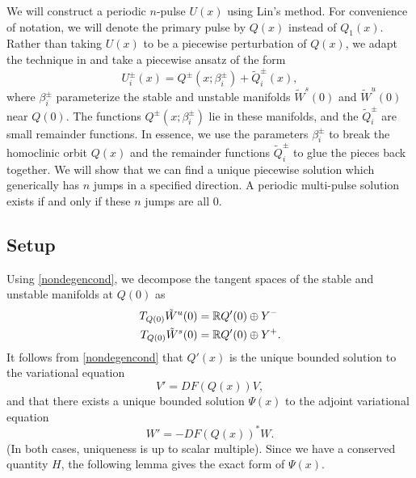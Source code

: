 \documentclass[12pt]{elsarticle}
\theoremstyle{plain}
\theoremstyle{definition}
\theoremstyle{remark}
\numberwithin{theorem}{section}
\numberwithin{equation}{section}
\begin{document}
We will construct a periodic $n$-pulse $U(x)$ using Lin's method. For convenience of notation, we will denote the primary pulse by $Q(x)$ instead of $Q_1(x)$. Rather than taking $U(x)$ to be a piecewise perturbation of $Q(x)$, we adapt the technique in \cite{Sandstede1997} and take a piecewise ansatz of the form
\[
U_i^\pm(x) = Q^\pm(x; \beta_i^\pm) + \tilde{Q}_i^\pm(x),
\]
where $\beta_i^\pm$ parameterize the stable and unstable manifolds $\tilde{W}^s(0)$ and $\tilde{W}^u(0)$ near $Q(0)$. The functions $Q^\pm(x; \beta_i^\pm)$ lie in these manifolds, and the $\tilde{Q}_i^\pm$ are small remainder functions. In essence, we use the parameters $\beta_i^\pm$ to break the homoclinic orbit $Q(x)$ and the remainder functions $\tilde{Q}_i^\pm$ to glue the pieces back together. We will show that we can find a unique piecewise solution which generically has $n$ jumps in a specified direction. A periodic multi-pulse solution exists if and only if these $n$ jumps are all 0.

\subsection{Setup}

Using \cref{nondegencond}, we decompose the tangent spaces of the stable and unstable manifolds at $Q(0)$ as 
\begin{equation*}
\begin{aligned}
T_{Q(0)}\tilde{W}^u(0) &= \mathbb{R} Q'(0) \oplus Y^- \\
T_{Q(0)}\tilde{W}^s(0) &= \mathbb{R} Q'(0) \oplus Y^+.
\end{aligned}
\end{equation*}
It follows from \cref{nondegencond} that $Q'(x)$ is the unique bounded solution to the variational equation
\begin{equation}\label{vareq1}
V' = DF(Q(x)) V,
\end{equation}
and that there exists a unique bounded solution $\Psi(x)$ to the adjoint variational equation
\begin{equation}\label{adjvareq1}
W' = -DF(Q(x))^* W.
\end{equation}
(In both cases, uniqueness is up to scalar multiple). Since we have a conserved quantity $H$, the following lemma gives the exact form of $\Psi(x)$.
\end{document}
